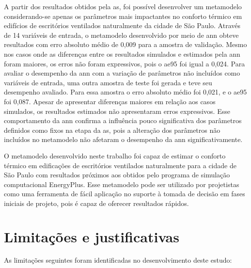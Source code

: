 \documentclass[brazil,hardcopy,openany]{ufscthesis} %
\begin{document}
	A partir dos resultados obtidos pela \acrshort{as}, foi possível desenvolver um metamodelo considerando-se apenas os parâmetros mais impactantes no conforto térmico em edifícios de escritórios ventilados naturalmente da cidade de São Paulo.
	Através de 14 variáveis de entrada, o metamodelo desenvolvido por meio de \acrfull{ann} obteve resultados com erro absoluto médio de 0,009 para a amostra de validação.
	Mesmo nos casos onde as diferenças entre os resultados simulados e estimados pela \acrshort{ann} foram maiores, os erros não foram expressivos, pois o \acrfull{ae95} foi igual a 0,024.
	Para avaliar o desempenho da \acrshort{ann} com a variação de parâmetros não incluídos como variáveis de entrada, uma outra amostra de teste foi gerada e teve seu desempenho avaliado.
	Para essa amostra o erro absoluto médio foi 0,021, e o \acrshort{ae95} foi 0,087. Apesar de apresentar diferenças maiores em relação aos casos simulados, os resultados estimados não apresentaram erros expressivos.
	Esse comportamento da \acrshort{ann} confirma a influência pouco significativa dos parâmetros definidos como fixos na etapa da \acrshort{as}, pois a alteração dos parâmetros não incluídos no metamodelo não afetaram o desempenho da \acrshort{ann} significativamente.
	
	O metamodelo desenvolvido neste trabalho foi capaz de estimar o conforto térmico em edificações de escritórios ventilados naturalmente para a cidade de São Paulo com resultados próximos aos obtidos pelo programa de simulação computacional EnergyPlus.
	Esse metamodelo pode ser utilizado por projetistas como uma ferramenta de fácil aplicação no suporte à tomada de decisão em fases iniciais de projeto, pois é capaz de oferecer resultados rápidos.
	
\section{Limitações e justificativas}

As limitações seguintes foram identificadas no desenvolvimento deste estudo:
\end{document}
